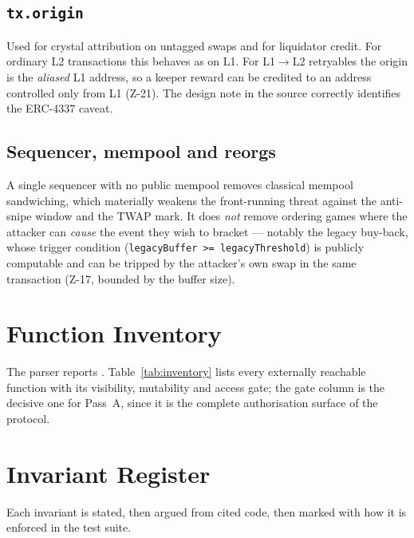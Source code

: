 \documentclass[10pt,a4paper]{article}
\newcommand{\code}[1]{\texttt{\small #1}}
\begin{document}
\subsection{\code{tx.origin}}
Used for crystal attribution on untagged swaps and for liquidator credit. For ordinary L2
transactions this behaves as on L1. For L1$\to$L2 retryables the origin is the
\emph{aliased} L1 address, so a keeper reward can be credited to an address controlled only
from L1 (Z-21). The design note in the source correctly identifies the ERC-4337 caveat.

\subsection{Sequencer, mempool and reorgs}
A single sequencer with no public mempool removes classical mempool sandwiching, which
materially weakens the front-running threat against the anti-snipe window and the TWAP
mark. It does \emph{not} remove ordering games where the attacker can \emph{cause} the
event they wish to bracket --- notably the legacy buy-back, whose trigger condition
(\code{legacyBuffer >= legacyThreshold}) is publicly computable and can be tripped by the
attacker's own swap in the same transaction (Z-17, bounded by the buffer size).

\section{Function Inventory}\label{sec:inventory}

The parser reports \unskip. Table~\ref{tab:inventory} lists
every externally reachable function with its visibility, mutability and access gate; the
gate column is the decisive one for Pass~A, since it is the complete authorisation
surface of the protocol.



\section{Invariant Register}\label{sec:invariants}

Each invariant is stated, then argued from cited code, then marked with how it is
enforced in the test suite.

\newcommand{\invrow}[4]{\textbf{#1} & #2 & #3 & #4 \\ \addlinespace}
\end{document}
